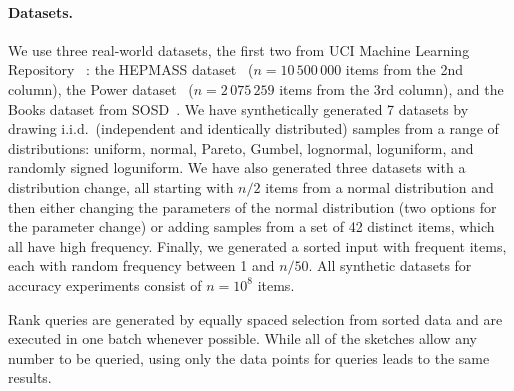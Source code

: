\documentclass[acmsmall]{acmart}
\theoremstyle{remark}
\begin{document}
\vspace{-0.2cm}

\paragraph{Datasets.}
We use three real-world datasets, the first two from UCI Machine Learning Repository~\cite{UCI_MLrepo} : the HEPMASS dataset~\cite{hepmass} ($n = 10\,500\,000$ items from the 2nd column),
the Power dataset~\cite{individual_household_electric_power_consumption_235} ($n = 2\,075\,259$ items from the 3rd column), and the Books dataset from SOSD~\cite{sosd,MarcusKRSMK0K20sosd}.
We have synthetically generated 7 datasets by drawing i.i.d.\ (independent and identically distributed) samples from
a range of distributions: uniform, normal, Pareto, Gumbel, lognormal, loguniform, and randomly signed loguniform.
We have also generated three datasets with a distribution change, all starting with $n/2$ items from a normal distribution
and then either changing the parameters of the normal distribution (two options for the parameter change) or adding samples from a set of 42 distinct items,
which all have high frequency.
Finally, we generated a sorted input with frequent items, each with random frequency between 1 and $n/50$.
All synthetic datasets for accuracy experiments consist of $n = 10^8$ items.


Rank queries are generated by equally spaced selection from sorted data and are executed in one batch whenever possible.
While all of the sketches allow any number to be queried, using only the data points for queries leads to the same results.



\end{document}
